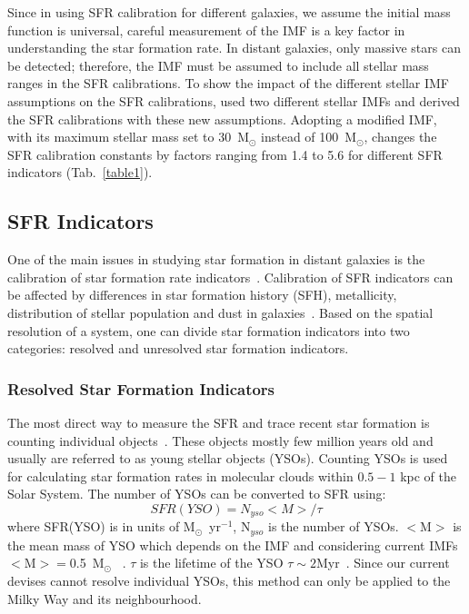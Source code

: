 Since in using SFR calibration for different galaxies, we assume the initial mass function is universal, careful measurement of the IMF is a key factor in understanding the star formation rate. 
In distant galaxies, only massive stars can be detected; therefore, the IMF must be assumed to include all stellar mass ranges in the SFR calibrations. 
To show the impact of the different stellar IMF assumptions on the SFR calibrations, \cite{Calzetti13} used two different stellar IMFs and derived the SFR calibrations with these new assumptions.
Adopting a modified \cite{Kroupa01} IMF, with its maximum stellar mass set to 30~M$_{\odot}$ instead of 100~M$_{\odot}$, changes the SFR calibration constants by factors ranging from 1.4 to 5.6 for different SFR indicators (Tab.~\ref{table1}). 

\subsection{SFR Indicators}

One of the main issues in studying star formation in distant galaxies is the calibration of star formation rate indicators~\citep[e.g.,][]{Lee10}. 
Calibration of SFR indicators can be affected by differences in star formation history (SFH), metallicity, distribution of stellar population and dust in galaxies~\citep{Calzetti13}. 
Based on the spatial resolution of a system, one can divide star formation indicators into two categories: resolved and unresolved star formation indicators.

\subsubsection{Resolved Star Formation Indicators}
The most direct way to measure the SFR and trace recent star formation is counting individual objects~\citep{Kennicutt12}. 
These objects mostly few million years old and usually are referred to as young stellar objects (YSOs). 
Counting YSOs is used for calculating star formation rates in molecular clouds within $0.5- 1$ kpc of the Solar System. 
The number of YSOs can be converted to SFR using: 
\begin{equation}
SFR(YSO) = N_{yso} <M>/\tau 
\end{equation}
where SFR(YSO) is in units of M$_{\odot}$~yr$^{-1}$, N$_{yso}$ is the number of YSOs.
$<$M$>$ is the mean mass of YSO which depends on the IMF and considering current IMFs $<$M$> = $0.5~M$_{\odot}$ ~\citep[][]{Kennicutt12}. 
$\tau$ is the lifetime of the YSO  $\tau \sim 2$Myr~\citep{Evans09}. 
Since our current devises cannot resolve individual YSOs, this method can only be applied to the Milky Way and its neighbourhood. 


